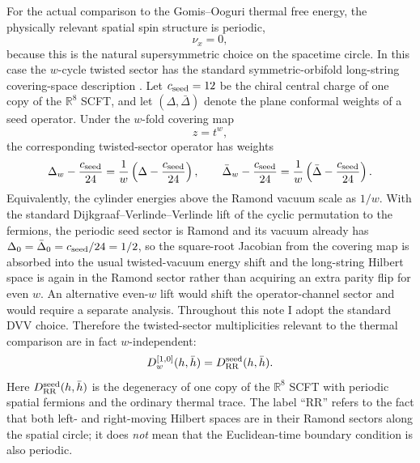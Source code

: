 \documentclass[11pt]{article}
\newcommand{\bR}{\mathbb{R}}
\begin{document}
For the actual comparison to the Gomis--Ooguri thermal free energy, the physically relevant spatial spin structure is periodic,
\begin{equation}\label{eq:physical-spatial-spin}
\nu_x=0,
\end{equation}
because this is the natural supersymmetric choice on the spacetime circle. In this case the $w$-cycle twisted sector has the standard symmetric-orbifold long-string covering-space description \cite{dijkgraaf1997matrixstring,arutyunov1998orbifoldscattering}. Let $c_{\rm seed}=12$ be the chiral central charge of one copy of the $\bR^8$ SCFT, and let $(\Delta,\bar\Delta)$ denote the plane conformal weights of a seed operator. Under the $w$-fold covering map
\begin{equation}\label{eq:covering-map}
z=t^w,
\end{equation}
the corresponding twisted-sector operator has weights
\begin{equation}\label{eq:twisted-weight-map}
\Delta_w-\frac{c_{\rm seed}}{24}
=
\frac{1}{w}\left(\Delta-\frac{c_{\rm seed}}{24}\right),
\qquad
\bar\Delta_w-\frac{c_{\rm seed}}{24}
=
\frac{1}{w}\left(\bar\Delta-\frac{c_{\rm seed}}{24}\right).
\end{equation}
Equivalently, the cylinder energies above the Ramond vacuum scale as $1/w$. With the standard Dijkgraaf--Verlinde--Verlinde lift of the cyclic permutation to the fermions, the periodic seed sector is Ramond and its vacuum already has $\Delta_0=\bar\Delta_0=c_{\rm seed}/24=1/2$, so the square-root Jacobian from the covering map is absorbed into the usual twisted-vacuum energy shift and the long-string Hilbert space is again in the Ramond sector rather than acquiring an extra parity flip for even $w$. An alternative even-$w$ lift would shift the operator-channel sector and would require a separate analysis. Throughout this note I adopt the standard DVV choice. Therefore the twisted-sector multiplicities relevant to the thermal comparison are in fact $w$-independent:
\begin{equation}\label{eq:w-independent-degeneracy}
D_w^{[1,0]}(h,\bar h)=D_{\rm RR}^{\mathrm{seed}}(h,\bar h).
\end{equation}
Here $D_{\rm RR}^{\mathrm{seed}}(h,\bar h)$ is the degeneracy of one copy of the $\bR^8$ SCFT with periodic spatial fermions and the ordinary thermal trace. The label ``RR'' refers to the fact that both left- and right-moving Hilbert spaces are in their Ramond sectors along the spatial circle; it does \emph{not} mean that the Euclidean-time boundary condition is also periodic.
\end{document}
